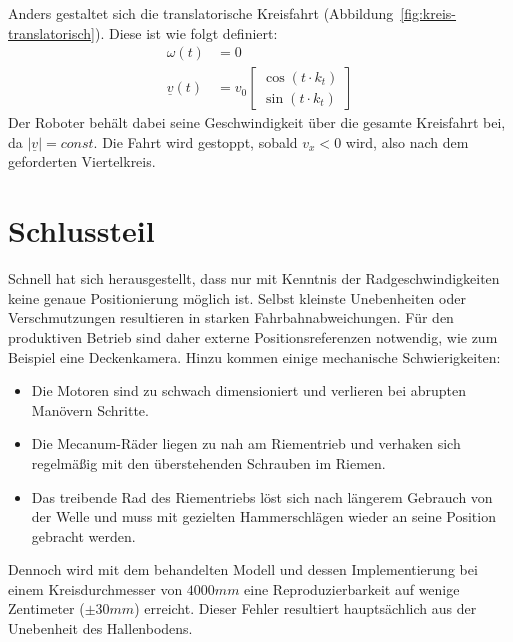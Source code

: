 \documentclass[a4paper]{article}
\begin{document}
Anders gestaltet sich die translatorische Kreisfahrt (Abbildung~\ref{fig:kreis-translatorisch}). Diese ist wie folgt definiert:
\begin{align*}
    \omega(t) &= 0 \\
    \underline{v}(t) &= v_0
        \begin{bmatrix}
            \cos(t \cdot k_t) \\
            \sin(t \cdot k_t)
        \end{bmatrix}
\end{align*}
Der Roboter behält dabei seine Geschwindigkeit über die gesamte Kreisfahrt bei, da $\left|\underline{v}\right| = const$. Die Fahrt wird gestoppt, sobald $v_x < 0$ wird, also nach dem geforderten Viertelkreis.


\section{Schlussteil}
Schnell hat sich herausgestellt, dass nur mit Kenntnis der Radgeschwindigkeiten keine genaue Positionierung möglich ist. Selbst kleinste Unebenheiten oder Verschmutzungen resultieren in starken Fahrbahnabweichungen. Für den produktiven Betrieb sind daher externe Positionsreferenzen notwendig, wie zum Beispiel eine Deckenkamera. Hinzu kommen einige mechanische Schwierigkeiten:

\begin{itemize}
    \item Die Motoren sind zu schwach dimensioniert und verlieren bei abrupten Manövern Schritte.
    \item Die Mecanum-Räder liegen zu nah am Riementrieb und verhaken sich regelmäßig mit den überstehenden Schrauben im Riemen.
    \item Das treibende Rad des Riementriebs löst sich nach längerem Gebrauch von der Welle und muss mit gezielten Hammerschlägen wieder an seine Position gebracht werden.
\end{itemize}

Dennoch wird mit dem behandelten Modell und dessen Implementierung bei einem Kreisdurchmesser von $4000 mm$ eine Reproduzierbarkeit auf wenige Zentimeter ($\pm 30 mm$) erreicht.
Dieser Fehler resultiert hauptsächlich aus der Unebenheit des Hallenbodens.
\end{document}
